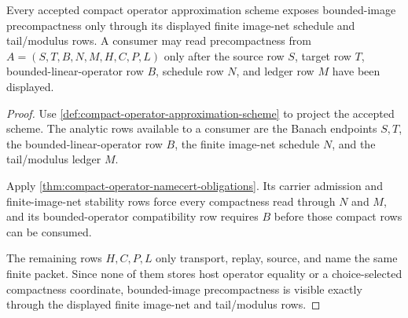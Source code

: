 \begin{theorem}
\label{thm:compact-operator-bounded-image-precompactness}
Every accepted compact operator approximation scheme exposes bounded-image precompactness only through its displayed finite image-net schedule and tail/modulus rows. A consumer may read precompactness from $A=(S,T,B,N,M,H,C,P,L)$ only after the source row $S$, target row $T$, bounded-linear-operator row $B$, schedule row $N$, and ledger row $M$ have been displayed.
\end{theorem}
\begin{proof}
Use \autoref{def:compact-operator-approximation-scheme} to project the accepted scheme. The analytic rows available to a consumer are the Banach endpoints $S,T$, the bounded-linear-operator row $B$, the finite image-net schedule $N$, and the tail/modulus ledger $M$.

Apply \autoref{thm:compact-operator-namecert-obligations}. Its carrier admission and finite-image-net stability rows force every compactness read through $N$ and $M$, and its bounded-operator compatibility row requires $B$ before those compact rows can be consumed.

The remaining rows $H,C,P,L$ only transport, replay, source, and name the same finite packet. Since none of them stores host operator equality or a choice-selected compactness coordinate, bounded-image precompactness is visible exactly through the displayed finite image-net and tail/modulus rows.
\end{proof}

